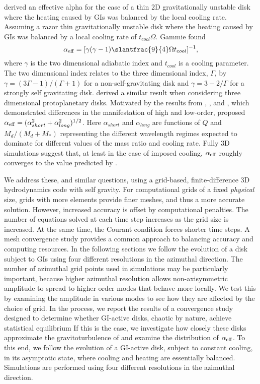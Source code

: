 \documentclass[manuscript]{aastex}
\begin{document}
\citet{gammie2001} derived an effective alpha for the case of a thin 2D gravitationally unstable disk where the heating caused by GIs was balanced by the local cooling rate.  
Assuming a razor thin gravitationally unstable disk where the heating caused by
GIs was balanced by a local cooling rate of $t_{cool}\Omega$.
Gammie found
\begin{equation}
\alpha_{\rm{eff}} = [\gamma(\gamma - 1) \slantfrac{9}{4}\Omega t_{cool}]^{-1},
\label{eq:gammie}
\end{equation}
where $\gamma$ is the two dimensional adiabatic index and $t_{cool}$ is a cooling parameter. 
The two dimensional index relates
to the three dimensional index, $\Gamma$, by 
$\gamma = (3\Gamma - 1) / (\Gamma + 1)$
for a non-self-gravitating
disk and
$\gamma = 3 - 2/\Gamma $
for a strongly self gravitating disk.   \cite{lodato2004} derived a similar result when considering three dimensional protoplanetary disks.
Motivated by
the results from \cite{laughlin1996}, \cite{gammie2001}, and \cite{lodato2004, lodato2005}, which demonstrated differences in the manifestation of high and low-order, \citet{kratter2008} 
proposed $\alpha_{\rm{eff}} = (\alpha_{short}^2 + \alpha_{long}^2)^{1/2}$. Here $\alpha_{short}$ and $\alpha_{long}$
are functions of $Q$ and $M_d/\left( M_d+M_*\right)$ representing 
the different wavelength regimes expected to dominate for different values of the mass ratio and cooling rate. 
Fully 3D simulations \citep[e.g.][]{lodato2004, cossins2009} suggest that, at least in the case of imposed cooling, $\alpha_{\rm{\rm{eff}}}$ roughly converges to the value predicted by \citeauthor{gammie2001}. 

We address these, and similar questions, using a grid-based, finite-difference 3D hydrodynamics code
with self gravity.
For computational grids of a fixed {\it physical} size,
grids with more elements provide finer meshes, and thus a more accurate solution. 
However, increased accuracy is offset by computational penalties.
The number of equations solved at each time step 
increases as the grid size is increased.  At the same time, the Courant condition 
forces shorter time steps.  A mesh convergence study 
provides a common approach to balancing accuracy and computing resources.
In the following sections we follow the evolution of a disk subject to GIs
using four different
resolutions in the azimuthal direction.  The number of azimuthal grid points used in simulations
may be particularly important, because higher azimuthal resolution 
allows non-axisymmetric amplitude to spread to higher-order modes 
that behave more locally. We test this by examining the amplitude in various 
modes to see how they are affected by the choice of grid.
In the process, 
we report the results of a convergence study designed to determine whether GI-active disks, chaotic by nature, achieve statistical equilibrium If this is the case, we investigate how closely these disks approximate the gravitoturbulence of \citet{gammie2001} and examine the distribution of $\alpha_{\rm{eff}}$. To this end, we follow the evolution of a GI-active disk, subject to constant cooling, in its asymptotic state, where cooling and heating are essentially balanced.  Simulations are performed using four different resolutions in the azimuthal direction.  
\end{document}
